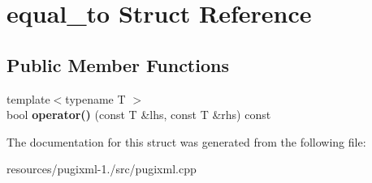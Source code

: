 \hypertarget{structequal__to}{\section{equal\+\_\+to Struct Reference}
\label{structequal__to}
}
\subsection*{Public Member Functions}
\begin{DoxyCompactItemize}
\item 
\hypertarget{structequal__to_acaf39da83a307280fef2f11691386b0e}{{\footnotesize template$<$typename T $>$ }\\bool {\bfseries operator()} (const T \&lhs, const T \&rhs) const }\label{structequal__to_acaf39da83a307280fef2f11691386b0e}

\end{DoxyCompactItemize}


The documentation for this struct was generated from the following file\+:\begin{DoxyCompactItemize}
\item 
resources/pugixml-\/1./src/pugixml.\+cpp\end{DoxyCompactItemize}
